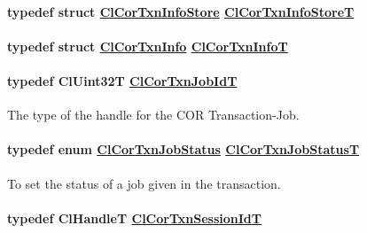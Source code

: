\hypertarget{group__group13_ga43}{
\paragraph[ClCorTxnInfoStoreT]{\setlength{\rightskip}{0pt plus 5cm}typedef struct \hyperlink{struct_cl_cor_txn_info_store}{Cl\-Cor\-Txn\-Info\-Store} \hyperlink{struct_cl_cor_txn_info_store}{Cl\-Cor\-Txn\-Info\-Store\-T}}\hfill}
\label{group__group13_ga43}


\hypertarget{group__group13_ga40}{
\paragraph[ClCorTxnInfoT]{\setlength{\rightskip}{0pt plus 5cm}typedef struct \hyperlink{struct_cl_cor_txn_info}{Cl\-Cor\-Txn\-Info} \hyperlink{struct_cl_cor_txn_info}{Cl\-Cor\-Txn\-Info\-T}}\hfill}
\label{group__group13_ga40}


\hypertarget{group__group13_ga18}{
\paragraph[ClCorTxnJobIdT]{\setlength{\rightskip}{0pt plus 5cm}typedef Cl\-Uint32T \hyperlink{group__group13_ga18}{Cl\-Cor\-Txn\-Job\-Id\-T}}\hfill}
\label{group__group13_ga18}


The type of the handle for the COR Transaction-Job. \hypertarget{group__group13_ga19}{
\paragraph[ClCorTxnJobStatusT]{\setlength{\rightskip}{0pt plus 5cm}typedef enum \hyperlink{group__group13_ga334}{Cl\-Cor\-Txn\-Job\-Status} \hyperlink{group__group13_ga19}{Cl\-Cor\-Txn\-Job\-Status\-T}}\hfill}
\label{group__group13_ga19}


To set the status of a job given in the transaction. \hypertarget{group__group13_ga16}{
\paragraph[ClCorTxnSessionIdT]{\setlength{\rightskip}{0pt plus 5cm}typedef Cl\-Handle\-T \hyperlink{group__group13_ga16}{Cl\-Cor\-Txn\-Session\-Id\-T}}\hfill}
\label{group__group13_ga16}


